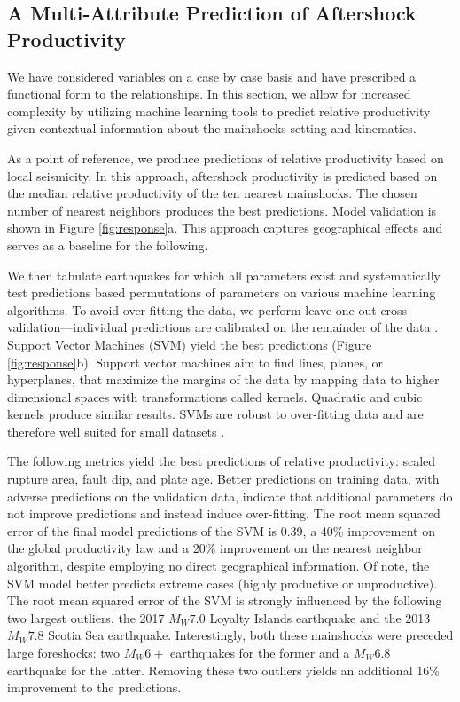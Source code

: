 \documentclass[draft]{agujournal2018}
\begin{document}
    \subsection{A Multi-Attribute Prediction of Aftershock Productivity}
    
    We have considered variables on a case by case basis and have prescribed a functional form to the relationships. In this section, we allow for increased complexity by utilizing machine learning tools to predict relative productivity given contextual information about the mainshocks setting and kinematics.
    
    As a point of reference, we produce predictions of relative productivity based on local seismicity. In this approach, aftershock productivity is predicted based on the median relative productivity of the ten nearest mainshocks. The chosen number of nearest neighbors produces the best predictions. Model validation is shown in Figure \ref{fig:response}a. This approach captures geographical effects and serves as a baseline for the following.
    
    We then tabulate earthquakes for which all parameters exist and systematically test predictions based permutations of parameters on various machine learning algorithms. To avoid over-fitting the data, we perform leave-one-out cross-validation---individual predictions are calibrated on the remainder of the data \citep{witten2011}. Support Vector Machines (SVM) yield the best predictions (Figure \ref{fig:response}b). Support vector machines aim to find lines, planes, or hyperplanes, that maximize the margins of the data by mapping data to higher dimensional spaces with transformations called kernels. Quadratic and cubic kernels produce similar results. SVMs are robust to over-fitting data and are therefore well suited for small datasets \citep{witten2011}. 
    
    The following metrics yield the best predictions of relative productivity: scaled rupture area, fault dip, and plate age. Better predictions on training data, with adverse predictions on the validation data, indicate that additional parameters do not improve predictions and instead induce over-fitting. The root mean squared error of the final model predictions of the SVM is 0.39, a 40\% improvement on the global productivity law and a 20\% improvement on the nearest neighbor algorithm, despite employing no direct geographical information. Of note, the SVM model better predicts extreme cases (highly productive or unproductive). The root mean squared error of the SVM is strongly influenced by the following two largest outliers, the 2017 $M_W7.0$ Loyalty Islands earthquake and the 2013 $M_W7.8$ Scotia Sea earthquake. Interestingly, both these mainshocks were preceded large foreshocks: two $M_W6+$ earthquakes for the former and a $M_W6.8$ earthquake for the latter. Removing these two outliers yields an additional 16\% improvement to the predictions.
    
\end{document}
